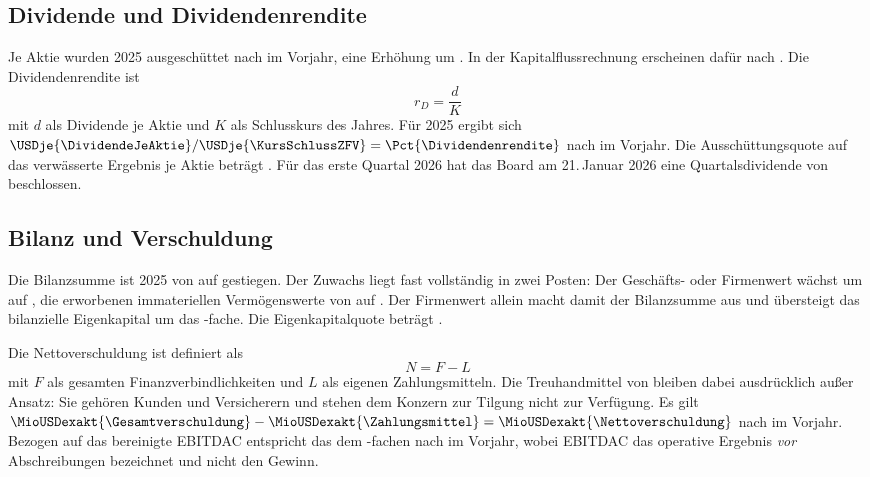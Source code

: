 \subsection{Dividende und Dividendenrendite}

Je Aktie wurden 2025 \USDje{\DividendeJeAktie} ausgesch\"uttet nach
\USDje{\DividendeJeAktieVJ} im Vorjahr, eine Erh\"ohung um
\Pct{\DividendeDelta}. In der Kapitalflussrechnung
erscheinen daf\"ur \MioUSDexakt{\Dividendenzahlung} nach
\MioUSDexakt{\DividendenzahlungVJ}.
Die Dividendenrendite ist
\begin{equation}
\label{eq:dividendenrendite}
r_D = \frac{d}{K}
\end{equation}
mit $d$ als Dividende je Aktie und $K$ als Schlusskurs des Jahres. F\"ur
2025 ergibt sich $\USDje{\DividendeJeAktie} / \USDje{\KursSchlussZFV} =
\Pct{\Dividendenrendite}$ nach \Pct{\DividendenrenditeVJ} im Vorjahr. Die
Aussch\"uttungsquote auf das verw\"asserte Ergebnis je Aktie betr\"agt
\Pct{\Ausschuettungsquote}. F\"ur das erste Quartal 2026 hat das Board am
21.\,Januar 2026 eine Quartalsdividende von
\USDje{\DividendeQuartalNeu} beschlossen.

\subsection{Bilanz und Verschuldung}

Die Bilanzsumme ist 2025 von \MioUSDexakt{\BilanzsummeVJ} auf
\MioUSDexakt{\Bilanzsumme} gestiegen. Der Zuwachs
liegt fast vollst\"andig in zwei Posten: Der Gesch\"afts- oder Firmenwert
w\"achst um \MioUSDexakt{\GoodwillZuwachs} auf \MioUSDexakt{\Goodwill}, die
erworbenen immateriellen Verm\"ogenswerte von
\MioUSDexakt{\ImmatVermoegenVJ} auf \MioUSDexakt{\ImmatVermoegen}. Der
Firmenwert allein macht damit \Pct{\GoodwillQuote} der Bilanzsumme aus und
\"ubersteigt das bilanzielle Eigenkapital um das
\Faktor{\GoodwillEKDeckung}-fache. Die Eigenkapitalquote betr\"agt
\Pct{\EKQuote}.

Die Nettoverschuldung ist definiert als
\begin{equation}
\label{eq:nettoverschuldung}
N = F - L
\end{equation}
mit $F$ als gesamten Finanzverbindlichkeiten und $L$ als eigenen
Zahlungsmitteln. Die Treuhandmittel von \MioUSDexakt{\TreuhandMittel}
bleiben dabei ausdr\"ucklich au{\ss}er Ansatz: Sie geh\"oren Kunden und
Versicherern und stehen dem Konzern zur Tilgung nicht zur
Verf\"ugung. Es gilt
$\MioUSDexakt{\Gesamtverschuldung} - \MioUSDexakt{\Zahlungsmittel} =
\MioUSDexakt{\Nettoverschuldung}$ nach
\MioUSDexakt{\NettoverschuldungVJ} im Vorjahr.
Bezogen auf das bereinigte EBITDAC entspricht das dem
\Faktor{\Verschuldungsgrad}-fachen nach \Faktor{\VerschuldungsgradVJ} im
Vorjahr, wobei EBITDAC das operative Ergebnis \emph{vor} Abschreibungen
bezeichnet und nicht den Gewinn.

